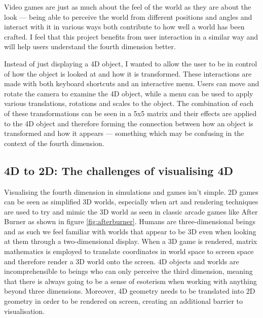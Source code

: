 \documentclass[11pt, a4paper]{article}
\begin{document}
Video games are just as much about the feel of the world as they are about the look --- being able to perceive the world from different positions and angles and interact with it in various ways both contribute to how well a world has been crafted. I feel that this project benefits from user interaction in a similar way and will help users understand the fourth dimension better. 

Instead of just displaying a 4D object, I wanted to allow the user to be in control of how the object is looked at and how it is transformed. These interactions are made with both keyboard shortcuts and an interactive menu. Users can move and rotate the camera to examine the 4D object, while a menu can be used to apply various translations, rotations and scales to the object. The combination of each of these transformations can be seen in a 5x5 matrix and their effects are applied to the 4D object and therefore forming the connection between how an object is transformed and how it appears --- something which may be confusing in the context of the fourth dimension.

\subsection{4D to 2D: The challenges of visualising 4D}
\label{subsec:challenges}

Visualising the fourth dimension in simulations and games isn't simple. 2D games can be seen as simplified 3D worlds, especially when art and rendering techniques are used to try and mimic the 3D world as seen in classic arcade games like After Burner \parencite{afterburner} as shown in figure \ref{fig:afterburner}. Humans are three-dimensional beings and as such we feel familiar with worlds that appear to be 3D even when looking at them through a two-dimensional display. When a 3D game is rendered, matrix mathematics is employed to translate coordinates in world space to screen space and therefore render a 3D world onto the screen. 4D objects and worlds are incomprehensible to beings who can only perceive the third dimension, meaning that there is always going to be a sense of esoterism when working with anything beyond three dimensions. Moreover, 4D geometry needs to be translated into 2D geometry in order to be rendered on screen, creating an additional barrier to visualisation.
\end{document}
